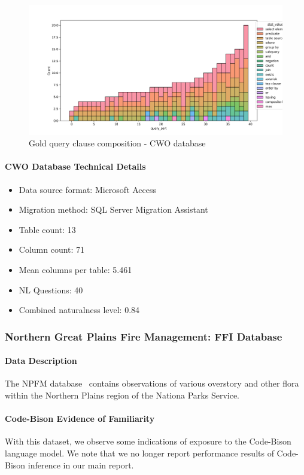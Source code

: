 \begin{figure}[H]
  \centering
  \includegraphics[width=\linewidth]{figures/query-stats/CratersWildlifeObservations-stats-clause-counts.png}
  \caption{Gold query clause composition - CWO database}
  \label{fig:query-complexity-cwo}
\end{figure}

\paragraph{CWO Database Technical Details}
\begin{itemize}
  \item Data source format: Microsoft Access
  \item Migration method: SQL Server Migration Assistant
  \item Table count: 13
  \item Column count: 71
  \item Mean columns per table: 5.461
  \item NL Questions: 40
  \item Combined naturalness level: 0.84 
\end{itemize}

\subsubsection{Northern Great Plains Fire Management: FFI Database}

\paragraph{Data Description}
The NPFM database~\cite{ngp-fire} contains observations of various overstory and other flora within the Northern Plains region of the Nationa Parks Service.

\paragraph{Code-Bison Evidence of Familiarity}
With this dataset, we observe some indications of exposure to the Code-Bison language model.
We note that we no longer report performance results of Code-Bison inference in our main report.

